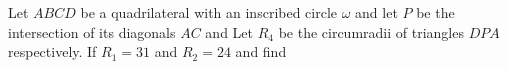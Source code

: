 Let $ABCD$ be a quadrilateral with an inscribed circle $\omega$ and let $P$ be the intersection of its diagonals $AC$ and  Let    $R_4$ be the circumradii of triangles    $DPA$ respectively. If $R_1=31$ and $R_2=24$ and  find 